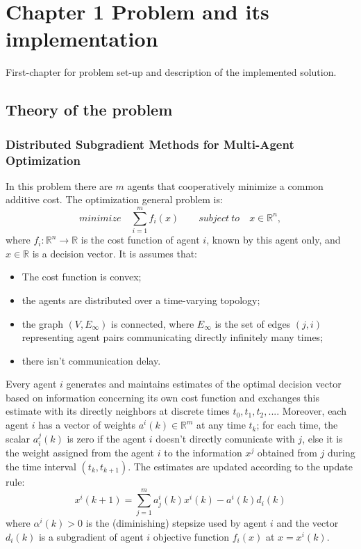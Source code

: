 \documentclass[a4paper,11pt,oneside]{book}
\begin{document}
\chapter{Chapter 1 Problem and its implementation} \label{Cap1}
First-chapter for problem set-up and description of the implemented solution. 

\section{Theory of the problem} \label{Sec1.1}
\subsection {Distributed Subgradient Methods for Multi-Agent Optimization} \label{Subsec1.1.1}
In this problem there are $m$ agents that cooperatively minimize a common additive cost. The optimization general problem is:\\
\begin{equation} \label{costfunct}
minimize \quad \sum\limits_{i=1}^{m} f_{i} \left( x \right) \qquad subject \ to \quad x \in \mathbb{R}^n,
\end{equation}
where $f_i : \mathbb{R}^n \longrightarrow \mathbb{R}$ is the cost function of agent $i$, known by this agent only, and $x \in \mathbb{R}$ is a decision vector. It is assumes that:
\begin{itemize} 
\item The cost function is convex;
\item the agents are distributed over a time-varying topology;
\item the graph $\left(V,E_\infty\right)$ is connected, where $E_\infty$ is the set of edges $\left(j,i\right)$ representing agent pairs communicating directly infinitely many times;
\item there isn't communication delay.
\end{itemize} 
Every agent $i$ generates and maintains estimates of the optimal decision vector based on information concerning its own cost function and exchanges this estimate with its directly neighbors at discrete times $t_0, t_1, t_2, ...$. Moreover, each agent $i$ has a vector of weights $a^i(k) \in \mathbb{R}^m$ at any time $t_k$; for each time, the scalar $a_i^j(k)$ is zero if the agent $i$ doesn't directly comunicate with $j$, else it is the weight assigned from the agent $i$ to the information $x^j$ obtained from $j$ during the time interval $(t_k,t_{k+1})$. The estimates are updated according to the update rule:
\cite{CITATION:1}
\begin{equation} \label{update}
x^i\left(k+1\right) = \sum_{j=1}^{m}{a_j^i\left(k\right)x^i\left(k\right)-a^i\left(k\right)d_i\left(k\right)}
\end{equation}
where $\alpha^i(k)>0$ is the (diminishing) stepsize used by agent $i$ and the vector $d_i(k)$ is a subgradient of agent $i$ objective function $f_i(x)$ at $x=x^i(k)$.
\end{document}
